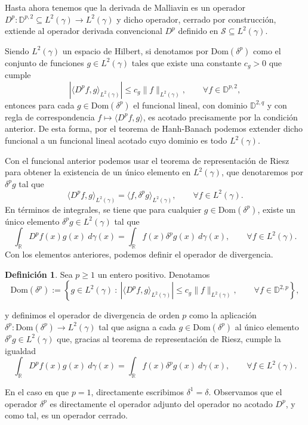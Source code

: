 \documentclass[letterpaper,twoside,12pt]{book}
\newcommand{\R}{\mathbb{R}}
\newcommand{\D}{\mathbb{D}}
\newcommand{\1}{\mathds{1}}
\newcommand{\abs}[1]{\left\lvert #1 \right\rvert}
\theoremstyle{definition}
\newtheorem{dfn}{Definición}
\theoremstyle{definition}
\theoremstyle{remark}
\theoremstyle{definition}
\theoremstyle{definition}
\theoremstyle{definition}
\theoremstyle{definition}
\theoremstyle{definition}
\begin{document}
Hasta ahora tenemos que la derivada de Malliavin es un operador $D^{p}:\mathbb{D}^{p,2}\subseteq L^2(\gamma)\longrightarrow L^2(\gamma)$ y dicho operador, cerrado por construcción, extiende al operador derivada convencional $D^{p}$ definido en $\mathcal{S}\subseteq L^2(\gamma)$. 

Siendo $L^{2}(\gamma)$ un espacio de Hilbert, si denotamos por $\text{Dom}(\delta^{p})$ como el conjunto de funciones $g\in L^{2}(\gamma)$ tales que existe una constante $c_g>0$ que cumple
\[
\abs{\langle D^{p}f,g\rangle_{L^2(\gamma)}}\leq c_g\|f\|_{L^2(\gamma)}, \qquad \forall f\in \mathbb{D}^{p,2},                 
\]
entonces para cada $g\in \text{Dom}(\delta^{p})$ el funcional lineal, con dominio $\D^{2,q}$ y con regla de correspondencia $f\longmapsto \langle D^{p}f,g\rangle$, es acotado precisamente por la condición anterior. De esta forma, por el teorema de Hanh-Banach podemos extender dicho funcional a un funcional lineal acotado cuyo dominio es todo $L^2(\gamma)$.

Con el funcional anterior podemos usar el teorema de representación de Riesz para obtener la existencia de un único elemento en $L^2(\gamma)$, que denotaremos por $\delta^{p}g$ tal que 
\[
\langle D^pf,g\rangle_{L^2(\gamma)}=\langle f,\delta^p g\rangle_{L^2(\gamma)}, \qquad \forall f\in L^2(\gamma).
\]
En términos de integrales, se tiene que para cualquier $g\in \text{Dom}(\delta^p)$, existe un único elemento $\delta^p g\in L^2(\gamma)$ tal que 
\[
 \int_\R D^{p}f(x) g(x) \ d\gamma(x)=\int_\R f(x)\delta^{p}g(x) \ d\gamma(x), \qquad \forall f\in L^2(\gamma).  
\]
Con los elementos anteriores, podemos definir el operador de divergencia.

\begin{dfn}
   Sea $p\geq1$ un entero positivo. Denotamos $$\text{Dom}(\delta^p):=\left\{g\in L^2(\gamma) \ : \ \abs{\langle D^{p}f,g\rangle_{L^2(\gamma)}}\leq c_g\|f\|_{L^2(\gamma)}, \qquad \forall f\in \D^{2,p}\right\},$$ 

   y definimos el operador de divergencia de orden $p$ como la aplicación $\delta^p:\text{Dom}(\delta^{p})\longrightarrow L^2(\gamma)$ tal que asigna a cada $g\in \text{Dom}(\delta^{p})$ al único elemento $\delta^{p} g\in L^2(\gamma)$ que, gracias al teorema de representación de Riesz, cumple la igualdad
       \[
       \int_\R D^{p}f(x)g(x) \ d\gamma(x)=\int_\R f(x)\delta^{p}g(x) \ d\gamma(x), \qquad \forall f\in L^2(\gamma).
      \]
\end{dfn}
En el caso en que $p=1$, directamente escribimos $\delta^1=\delta$. Observamos que el operador $\delta^p$ es directamente el operador adjunto del operador no acotado  $D^{p}$, y como tal, es un operador cerrado.
\end{document}

